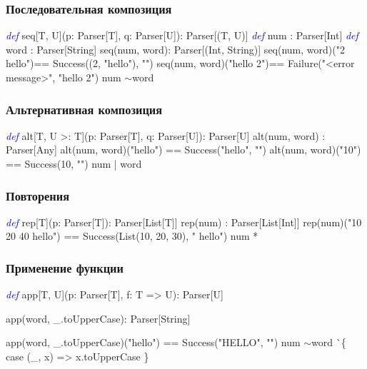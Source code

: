 \documentclass{beamer}
\newcommand{\mytilde}{$\sim$}
\newcommand{\keyword}[1]{\textcolor{blue}{\textsl{#1}}}
\begin{document}
\begin{frame}[fragile]
  \frametitle{Последовательная композиция}
  \begin{semiverbatim}
\keyword{def} seq[T, U](p: Parser[T], q: Parser[U]): Parser[(T, U)]
\pause
\keyword{def} num : Parser[Int]
\keyword{def} word : Parser[String]
\pause
seq(num, word)\pause : Parser[(Int, String)]
\pause
seq(num, word)("2 hello")\pause == Success((2, "hello"), "")
\pause
seq(num, word)("hello 2")\pause == Failure("<error message>",
                                     "hello 2")
\pause
num \mytilde word
  \end{semiverbatim}
\end{frame}

\begin{frame}[fragile]
  \frametitle{Альтернативная композиция}
  \begin{semiverbatim}
\keyword{def} alt[T, U >: T](p: Parser[T], q: Parser[U]): Parser[U]
\pause
alt(num, word) : Parser[Any]
\pause
alt(num, word)("hello") == Success("hello", "")
alt(num, word)("10") == Success(10, "")
\pause
num | word
  \end{semiverbatim}
\end{frame}

\begin{frame}[fragile]
  \frametitle{Повторения}
  \begin{semiverbatim}
\keyword{def} rep[T](p: Parser[T]): Parser[List[T]]
\pause
rep(num) : Parser[List[Int]]
\pause
rep(num)("10 20 40 hello") == Success(List(10, 20, 30),
                                      " hello")
\pause
num *
  \end{semiverbatim}
\end{frame}

\begin{frame}[fragile]
  \frametitle{Применение функции}
  \begin{semiverbatim}
\keyword{def} app[T, U](p: Parser[T], f: T => U): Parser[U]\pause

app(word, _.toUpperCase)\pause : Parser[String]\pause

app(word, _.toUpperCase)("hello") == Success("HELLO",
                                             "")
\pause
num \mytilde word ^^ \{
  case (_, x) => x.toUpperCase
\}
  \end{semiverbatim}
\end{frame}
\end{document}
